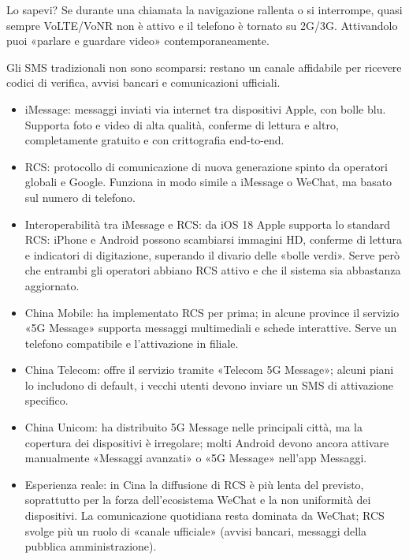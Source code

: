 \begin{tcbinfo}{Lo sapevi?}
Se durante una chiamata la navigazione rallenta o si interrompe, quasi sempre VoLTE/VoNR non è attivo e il telefono è tornato su 2G/3G. Attivandolo puoi «parlare e guardare video» contemporaneamente.

\end{tcbinfo}


Gli SMS tradizionali non sono scomparsi: restano un canale affidabile per ricevere codici di verifica, avvisi bancari e comunicazioni ufficiali.

\begin{itemize}
  \item iMessage: messaggi inviati via internet tra dispositivi Apple, con bolle blu. Supporta foto e video di alta qualità, conferme di lettura e altro, completamente gratuito e con crittografia end-to-end.
  \item RCS: protocollo di comunicazione di nuova generazione spinto da operatori globali e Google. Funziona in modo simile a iMessage o WeChat, ma basato sul numero di telefono.
  \item Interoperabilità tra iMessage e RCS: da iOS 18 Apple supporta lo standard RCS: iPhone e Android possono scambiarsi immagini HD, conferme di lettura e indicatori di digitazione, superando il divario delle «bolle verdi». Serve però che entrambi gli operatori abbiano RCS attivo e che il sistema sia abbastanza aggiornato.
\end{itemize}


\begin{itemize}
  \item China Mobile: ha implementato RCS per prima; in alcune province il servizio «5G Message» supporta messaggi multimediali e schede interattive. Serve un telefono compatibile e l'attivazione in filiale.
  \item China Telecom: offre il servizio tramite «Telecom 5G Message»; alcuni piani lo includono di default, i vecchi utenti devono inviare un SMS di attivazione specifico.
  \item China Unicom: ha distribuito 5G Message nelle principali città, ma la copertura dei dispositivi è irregolare; molti Android devono ancora attivare manualmente «Messaggi avanzati» o «5G Message» nell'app Messaggi.
  \item Esperienza reale: in Cina la diffusione di RCS è più lenta del previsto, soprattutto per la forza dell'ecosistema WeChat e la non uniformità dei dispositivi. La comunicazione quotidiana resta dominata da WeChat; RCS svolge più un ruolo di «canale ufficiale» (avvisi bancari, messaggi della pubblica amministrazione).
\end{itemize}


